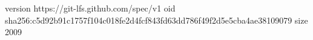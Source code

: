 version https://git-lfs.github.com/spec/v1
oid sha256:c5d92b91c1757f104c018fe2d4fcf843fd63dd786f49f2d5e5cba4ae38109079
size 2009
